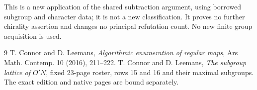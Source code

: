 \documentclass[11pt,a4paper]{article}
\begin{document}
This is a new application of the shared subtraction argument, using
borrowed subgroup and character data; it is not a new classification.
It proves no further chirality assertion and changes no principal
refutation count. No new finite group acquisition is used.

\begin{thebibliography}{9}
 T. Connor and D. Leemans, \emph{Algorithmic enumeration
of regular maps}, Ars Math. Contemp. 10 (2016), 211--222.
 T. Connor and D. Leemans, \emph{The subgroup lattice
of $O'N$}, fixed 23-page roster, rows 15 and 16 and their maximal
subgroups. The exact edition and native pages are bound separately.
\end{thebibliography}
\end{document}
